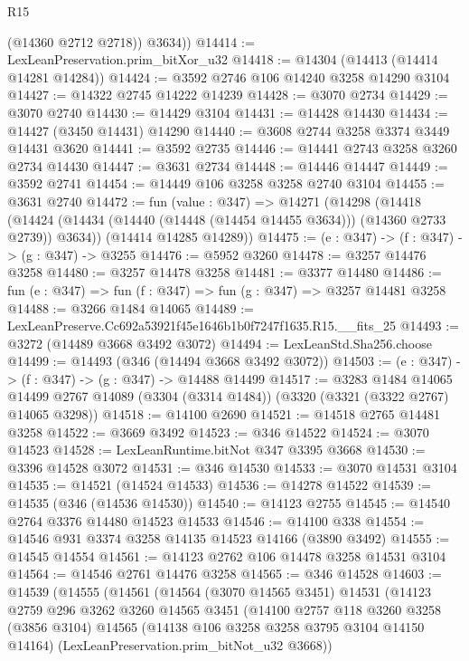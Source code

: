 \begin{lexlean}{R15}
\begin{coremodule}
          (@14360 @2712 @2718))
        @3634))
@14414 := LexLeanPreservation.prim_bitXor_u32
@14418 := @14304 (@14413 (@14414 @14281 @14284))
@14424 := @3592 @2746 @106 @14240 @3258 @14290 @3104
@14427 := @14322 @2745 @14222 @14239
@14428 := @3070 @2734
@14429 := @3070 @2740
@14430 := @14429 @3104
@14431 := @14428 @14430
@14434 := @14427 (@3450 @14431) @14290
@14440 := @3608 @2744 @3258 @3374 @3449 @14431 @3620
@14441 := @3592 @2735
@14446 := @14441 @2743 @3258 @3260 @2734 @14430
@14447 := @3631 @2734
@14448 := @14446 @14447
@14449 := @3592 @2741
@14454 := @14449 @106 @3258 @3258 @2740 @3104
@14455 := @3631 @2740
@14472 := fun (value : @347) =>
  @14271
    (@14298
      (@14418 (@14424 (@14434 (@14440 (@14448 (@14454 @14455 @3634))) (@14360 @2733 @2739)) @3634))
      (@14414 @14285 @14289))
@14475 := (e : @347) -> (f : @347) -> (g : @347) -> @3255
@14476 := @5952 @3260
@14478 := @3257 @14476 @3258
@14480 := @3257 @14478 @3258
@14481 := @3377 @14480
@14486 := fun (e : @347) => fun (f : @347) => fun (g : @347) => @3257 @14481 @3258
@14488 := @3266 @1484 @14065
@14489 := LexLeanPreserve.Cc692a53921f45e1646b1b0f7247f1635.R15.__fits_25
@14493 := @3272 (@14489 @3668 @3492 @3072)
@14494 := LexLeanStd.Sha256.choose
@14499 := @14493 (@346 (@14494 @3668 @3492 @3072))
@14503 := (e : @347) -> (f : @347) -> (g : @347) -> @14488 @14499
@14517 := @3283
    @1484
    @14065
    @14499
    @2767
    @14089
    (@3304 (@3314 @1484))
    (@3320 (@3321 (@3322 @2767) @14065 @3298))
@14518 := @14100 @2690
@14521 := @14518 @2765 @14481 @3258
@14522 := @3669 @3492
@14523 := @346 @14522
@14524 := @3070 @14523
@14528 := LexLeanRuntime.bitNot @347 @3395 @3668
@14530 := @3396 @14528 @3072
@14531 := @346 @14530
@14533 := @3070 @14531 @3104
@14535 := @14521 (@14524 @14533)
@14536 := @14278 @14522
@14539 := @14535 (@346 (@14536 @14530))
@14540 := @14123 @2755
@14545 := @14540 @2764 @3376 @14480 @14523 @14533
@14546 := @14100 @338
@14554 := @14546 @931 @3374 @3258 @14135 @14523 @14166 (@3890 @3492)
@14555 := @14545 @14554
@14561 := @14123 @2762 @106 @14478 @3258 @14531 @3104
@14564 := @14546 @2761 @14476 @3258
@14565 := @346 @14528
@14603 := @14539
    (@14555
      (@14561
        (@14564
          (@3070 @14565 @3451)
          @14531
          (@14123
            @2759
            @296
            @3262
            @3260
            @14565
            @3451
            (@14100
              @2757
              @118
              @3260
              @3258
              (@3856 @3104)
              @14565
              (@14138 @106 @3258 @3258 @3795 @3104 @14150 @14164)
              (LexLeanPreservation.prim_bitNot_u32 @3668))

\end{coremodule}
\end{lexlean}
